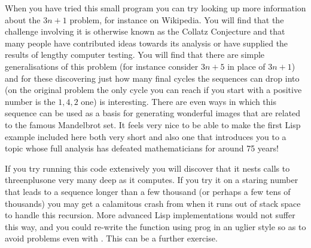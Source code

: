 When you have tried this small program you can try looking up more
information about the $3n+1$ problem, for instance on Wikipedia. You will
find that the challenge involving it is otherwise known as the Collatz
Conjecture and that many people have contributed ideas towards its
analysis or have supplied the results of lengthy computer testing. You will
find that there are simple generalisations of this problem (for instance
consider $3n+5$ in place of $3n+1$) and for these discovering just how many
final cycles the sequences can drop into (on the original problem the only
cycle you can reach if you start with a positive number is the $1, 4, 2$ one)
is interesting. There are even ways in which this sequence can be used as
a basis for generating wonderful images that are related to the famous
Mandelbrot set. It feels very nice to be able to make the first Lisp
example included here both very short and also one that introduces you to
a topic whose full analysis has defeated mathematicians for around 75 years!

If you try running this code extensively you will discover that it
nests calls to {\tx threenplusone} very many deep as it
computes. If you try it on a staring number that leads to a sequence
longer than a few thousand (or perhaps a few tens of thousands)
you may get a calamitous crash from \vsl{} when it
runs out of stack space to handle this recursion. More advanced Lisp
implementations would not suffer this way, and you could re-write the
function using {\tx prog} in an uglier style so as to avoid problems
even with \vsl. This can be a further exercise.

